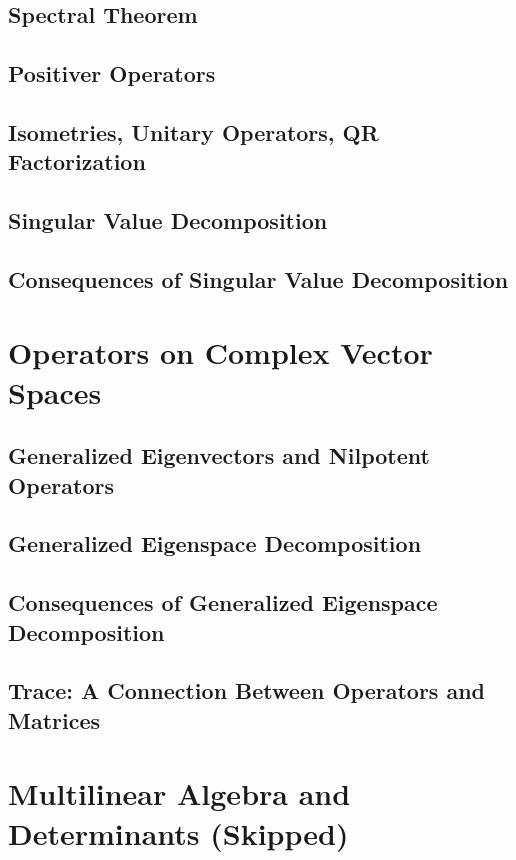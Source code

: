 \documentclass{book}
\begin{document}
\section{Spectral Theorem}
\section{Positiver Operators}
\section{Isometries, Unitary Operators, QR Factorization}
\section{Singular Value Decomposition}
\section{Consequences of Singular Value Decomposition}





\chapter{Operators on Complex Vector Spaces}
\section{Generalized Eigenvectors and Nilpotent Operators}
\section{Generalized Eigenspace Decomposition}
\section{Consequences of Generalized Eigenspace Decomposition}
\section{Trace: A Connection Between Operators and Matrices}





\chapter{Multilinear Algebra and Determinants (Skipped)}
\end{document}
